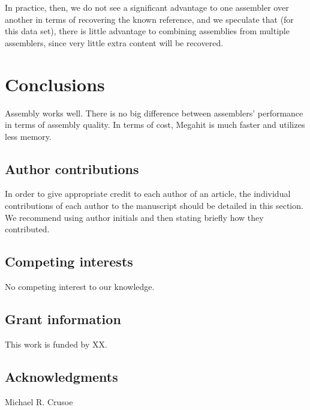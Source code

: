 \documentclass[10pt,a4paper,twocolumn]{article}
\begin{document}
In practice, then, we do not see a significant advantage to one
assembler over another in terms of recovering the known reference, and
we speculate that (for this data set), there is little advantage to
combining assemblies from multiple assemblers, since very little extra
content will be recovered.


\section*{Conclusions}

Assembly works well. There is no big difference between assemblers'
performance in terms of assembly quality. In terms of cost, Megahit is
much faster and utilizes less memory.



\subsection*{Author contributions}
In order to give appropriate credit to each author of an article, the
individual contributions of each author to the manuscript should be
detailed in this section. We recommend using author initials and then
stating briefly how they contributed.

\subsection*{Competing interests}
No competing interest to our knowledge.

\subsection*{Grant information}
This work is funded by XX.

\subsection*{Acknowledgments}
Michael R. Crusoe

{\small }

\bigskip

\end{document}
